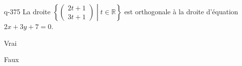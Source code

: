 \begin{truefalse}{q-375}
La droite  $\left\{\begin{pmatrix}2t+1\\3t+1\end{pmatrix}\middle| t\in\mathbb{R}\right\}$ est orthogonale à la droite d'équation $2x+3y+7=0$.
\item* Vrai
\item Faux
\end{truefalse}


